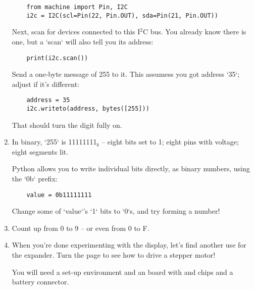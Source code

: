 \documentclass{../tutorial}
\begin{document}
\begin{enumerate}
    \begin{lstlisting}
    from machine import Pin, I2C
    i2c = I2C(scl=Pin(22, Pin.OUT), sda=Pin(21, Pin.OUT))
    \end{lstlisting}

    Next, scan for devices connected to this I$^2$C bus.
    You already know there is one, but a `scan` will also tell you its address:

    \begin{lstlisting}
    print(i2c.scan())
    \end{lstlisting}

    Send a one-byte message of 255 to it.
    This assumess you got address `35`; adjust if it's different:

    \begin{lstlisting}
    address = 35
    i2c.writeto(address, bytes([255]))
    \end{lstlisting}

    That should turn the digit fully on.

    \begin{comment}
        The display has two digits, but for simplicity, we've only connected
        one of them.
        There are enough wires as it is!
    \end{comment}

\item
    In binary, `255` is 11111111$_b$ – eight bits set to 1;
    eight pins with voltage; eight segments lit.

    Python allows you to write individual bits directly, as binary numbers,
    using the `0b` prefix:

    \begin{lstlisting}
    value = 0b11111111
    \end{lstlisting}

    Change some of `value`'s `1` bits to `0`s, and try forming a number!

\item
    Count up from 0 to 9 – or even from 0 to F.

\item
    When you're done experimenting with the display,
    let's find another use for the expander.
    Turn the page to see how to drive a stepper motor!

\clearpage

    You will need a set-up environment and an  board
    with  and  chips and a battery connector.


\end{enumerate}
\end{document}
